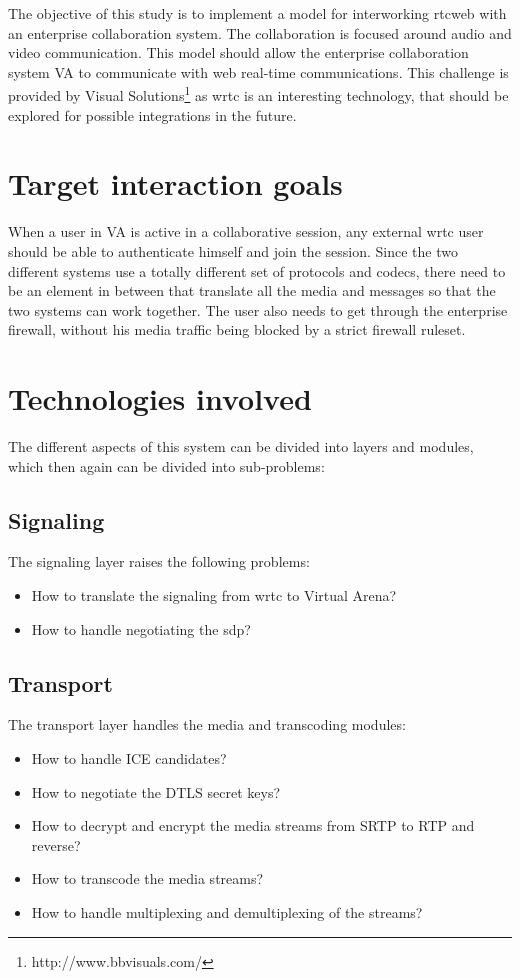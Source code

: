
The objective of this study is to implement a model for interworking \gls{rtcweb} with an enterprise collaboration system. The collaboration is focused around audio and video communication. This model should allow the enterprise collaboration system VA to communicate with web real-time communications. This challenge is provided by Visual Solutions\footnote{http://www.bbvisuals.com/} as \gls{wrtc} is an interesting technology, that should be explored for possible integrations in the future.

\section{Target interaction goals}
When a user in VA is active in a collaborative session, any external \gls{wrtc} user should be able to authenticate himself and join the session. Since the two different systems use a totally different set of protocols and codecs, there need to be an element in between that translate all the media and messages so that the two systems can work together. The user also needs to get through the enterprise firewall, without his media traffic being blocked by a strict firewall ruleset.

\section{Technologies involved}
The different aspects of this system can be divided into layers and modules, which then again can be divided into sub-problems:

\subsection{Signaling}
The signaling layer raises the following problems:
\begin{itemize}
\item{How to translate the signaling from \gls{wrtc} to Virtual Arena?}
\item{How to handle negotiating the \gls{sdp}?}
\end{itemize}

\subsection{Transport}
The transport layer handles the media and transcoding modules:
\begin{itemize}
\item{How to handle ICE candidates?}
\item{How to negotiate the DTLS secret keys?}
\item{How to decrypt and encrypt the media streams from SRTP to RTP and reverse?}
\item{How to transcode the media streams?}
\item{How to handle multiplexing and demultiplexing of the streams?}
\end{itemize}

